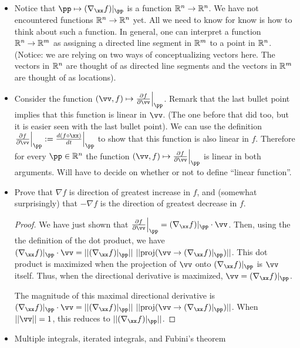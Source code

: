 \begin{itemize}
    \item Notice that $\pp \mapsto (\nabla_\xx f)|_\pp$ is a function $\mathbb{R}^n \rightarrow \mathbb{R}^n$. We have not encountered functions $\mathbb{R}^n \rightarrow \mathbb{R}^n$ yet. All we need to know for know is how to think about such a function. In general, one can interpret a function $\mathbb{R}^n \rightarrow \mathbb{R}^m$ as assigning a directed line segment in $\mathbb{R}^m$ to a point in $\mathbb{R}^n$. (Notice: we are relying on two ways of conceptualizing vectors here. The vectors in $\mathbb{R}^n$ are thought of as directed line segments and the vectors in $\mathbb{R}^m$ are thought of as locations).
    
    \item Consider the function $(\vv, f) \mapsto \frac{\pd f}{\pd \vv} \Big|_\pp$. Remark that the last bullet point implies that this function is linear in $\vv$. (The one before that did too, but it is easier seen with the last bullet point). We can use the definition $\frac{\pd f}{\pd \vv} \Big|_\pp := \frac{d (f \circ \xx)}{dt}\Big|_\pp$ to show that this function is also linear in $f$. Therefore for every $\pp \in \R^n$ the function $(\vv, f) \mapsto \frac{\pd f}{\pd \vv} \Big|_\pp$ is linear in both arguments. Will have to decide on whether or not to define ``linear function''.
    
    \item Prove that $\nabla f$ is direction of greatest increase in $f$, and (somewhat surprisingly) that $-\nabla f$ is the direction of greatest decrease in $f$.
    
    \begin{proof}
        We have just shown that $\frac{\pd f}{\pd \vv}\Big|_\pp = (\nabla_\xx f)|_\pp \cdot \vv$. Then, using the the definition of the dot product, we have ${(\nabla_\xx f)|_\pp \cdot \vv = ||(\nabla_\xx f)|_\pp|| \spc ||\proj(\vv \rightarrow (\nabla_\xx f)|_\pp)||}$. This dot product is maximized when the projection of $\vv$ onto $(\nabla_\xx f)|_\pp$ is $\vv$ itself. Thus, when the directional derivative is maximized, $\vv = (\nabla_\xx f)|_\pp$.
        
        The magnitude of this maximal directional derivative is ${(\nabla_\xx f)|_\pp \cdot \vv = ||(\nabla_\xx f)|_\pp|| \spc ||\proj(\vv \rightarrow (\nabla_\xx f)|_\pp)||}$. When $||\vv|| = 1$, this reduces to $||(\nabla_\xx f)|_\pp||$.
    \end{proof}
    
    \item Multiple integrals, iterated integrals, and Fubini's theorem
\end{itemize}


